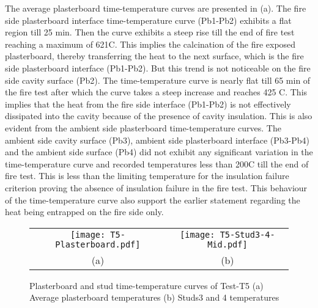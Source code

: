 The average plasterboard time-temperature curves are presented in  (a). The fire side plasterboard interface time-temperature curve (Pb1-Pb2) exhibits a flat region till 25 min. Then the curve exhibits a steep rise till the end of fire test reaching a maximum of 621\degree C. This implies the calcination of the fire exposed plasterboard, thereby transferring the heat to the next surface, which is the fire side plasterboard interface (Pb1-Pb2). But this trend is not noticeable on the fire side cavity surface (Pb2). The time-temperature curve is nearly flat till 65 min of the fire test after which the curve takes a steep increase and reaches 425 \degree C. This implies that the heat from the fire side interface (Pb1-Pb2) is not effectively dissipated into the cavity because of the presence of cavity insulation. This is also evident from the ambient side plasterboard time-temperature curves. The ambient side cavity surface (Pb3), ambient side plasterboard interface (Pb3-Pb4) and the ambient side surface (Pb4) did not exhibit any significant variation in the time-temperature curve and recorded temperatures less than 200\degree C till the end of fire test. This is less than the limiting temperature for the insulation failure criterion proving the absence of insulation failure in the fire test. This behaviour of the time-temperature curve also support the earlier statement regarding the heat being entrapped on the fire side only.
\begin{figure}[!htbp]
	\centering	
		\begin{tabular}{cc}
			\texttt{[image: T5-Plasterboard.pdf]} & \texttt{[image: T5-Stud3-4-Mid.pdf]} \\
			(a) & (b) \\
			\end{tabular}
		\caption{Plasterboard and stud time-temperature curves of Test-T5 (a) Average plasterboard temperatures (b) Studs3 and 4 temperatures}
		\label{fig:T5-time-temperature}
\end{figure}

